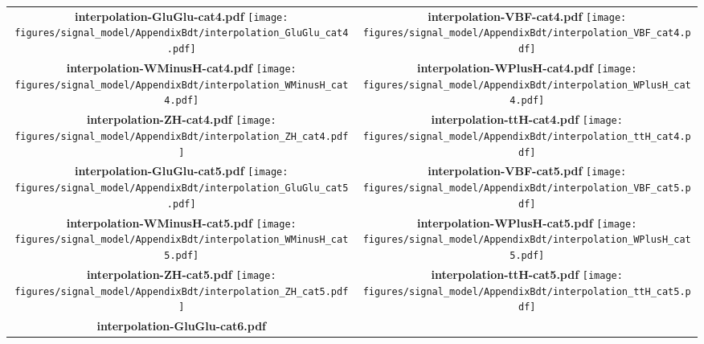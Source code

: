 \begin{longtable}{|c|c|}
{}
 \\
\hline
\parbox{0.47\textwidth}{
\centering
{\bfseries interpolation-GluGlu-cat4.pdf}
\texttt{[image: figures/signal\_model/AppendixBdt/interpolation\_GluGlu\_cat4.pdf]}
}
 & \parbox{0.47\textwidth}{
\centering
{\bfseries interpolation-VBF-cat4.pdf}
\texttt{[image: figures/signal\_model/AppendixBdt/interpolation\_VBF\_cat4.pdf]}
}
 \\
\hline
\parbox{0.47\textwidth}{
\centering
{\bfseries interpolation-WMinusH-cat4.pdf}
\texttt{[image: figures/signal\_model/AppendixBdt/interpolation\_WMinusH\_cat4.pdf]}
}
 & \parbox{0.47\textwidth}{
\centering
{\bfseries interpolation-WPlusH-cat4.pdf}
\texttt{[image: figures/signal\_model/AppendixBdt/interpolation\_WPlusH\_cat4.pdf]}
}
 \\
\hline
\parbox{0.47\textwidth}{
\centering
{\bfseries interpolation-ZH-cat4.pdf}
\texttt{[image: figures/signal\_model/AppendixBdt/interpolation\_ZH\_cat4.pdf]}
}
 & \parbox{0.47\textwidth}{
\centering
{\bfseries interpolation-ttH-cat4.pdf}
\texttt{[image: figures/signal\_model/AppendixBdt/interpolation\_ttH\_cat4.pdf]}
}
 \\
\hline
\parbox{0.47\textwidth}{
\centering
{\bfseries interpolation-GluGlu-cat5.pdf}
\texttt{[image: figures/signal\_model/AppendixBdt/interpolation\_GluGlu\_cat5.pdf]}
}
 & \parbox{0.47\textwidth}{
\centering
{\bfseries interpolation-VBF-cat5.pdf}
\texttt{[image: figures/signal\_model/AppendixBdt/interpolation\_VBF\_cat5.pdf]}
}
 \\
\hline
\parbox{0.47\textwidth}{
\centering
{\bfseries interpolation-WMinusH-cat5.pdf}
\texttt{[image: figures/signal\_model/AppendixBdt/interpolation\_WMinusH\_cat5.pdf]}
}
 & \parbox{0.47\textwidth}{
\centering
{\bfseries interpolation-WPlusH-cat5.pdf}
\texttt{[image: figures/signal\_model/AppendixBdt/interpolation\_WPlusH\_cat5.pdf]}
}
 \\
\hline
\parbox{0.47\textwidth}{
\centering
{\bfseries interpolation-ZH-cat5.pdf}
\texttt{[image: figures/signal\_model/AppendixBdt/interpolation\_ZH\_cat5.pdf]}
}
 & \parbox{0.47\textwidth}{
\centering
{\bfseries interpolation-ttH-cat5.pdf}
\texttt{[image: figures/signal\_model/AppendixBdt/interpolation\_ttH\_cat5.pdf]}
}
 \\
\hline
\parbox{0.47\textwidth}{
\centering
{\bfseries interpolation-GluGlu-cat6.pdf}
}
\end{longtable}
